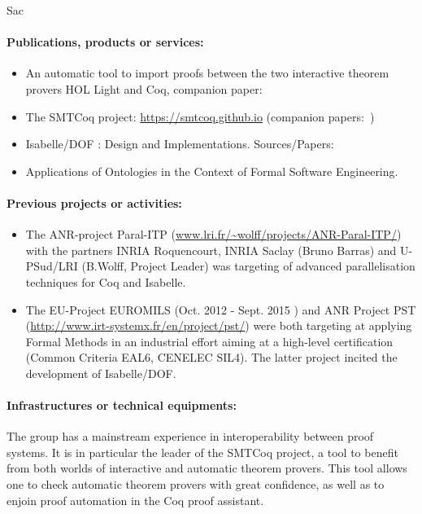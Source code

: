 \begin{sitedescription}{Sac}
\paragraph{Publications, products or services:}

\begin{itemize}
\item An automatic tool to import proofs between the two interactive
  theorem provers HOL Light and Coq, companion
  paper:~\cite{DBLP:conf/itp/KellerW10}
\item The SMTCoq project: \url{https://smtcoq.github.io} (companion
  papers:~\cite{DBLP:conf/cpp/ArmandFGKTW11,DBLP:conf/cav/EkiciMTKKRB17})
\item Isabelle/DOF : Design and Implementations.
 Sources/Papers: \cite{brucker_achim_d_2019_3370483,brucker.ea:isabelle-ontologies:2018}
\item Applications of Ontologies in the Context of Formal Software Engineering.
 \cite{brucker.ea:ontologies-certification:2019}
\end{itemize}


\paragraph{Previous projects or activities:}

\begin{itemize}
\item The ANR-project Paral-ITP (\url{www.lri.fr/~wolff/projects/ANR-Paral-ITP/}) with the  
      partners INRIA Roquencourt, INRIA Saclay (Bruno Barras) 
      and U-PSud/LRI (B.Wolff, Project Leader) was targeting 
      of advanced parallelisation techniques for Coq and Isabelle.
\item The EU-Project EUROMILS (Oct. 2012 - Sept. 2015 ) and 
      ANR Project PST (\url{http://www.irt-systemx.fr/en/project/pst/})
      were both targeting at applying Formal Methods in an industrial
      effort aiming at a high-level certification (Common Criteria EAL6, 
      CENELEC SIL4). The latter project incited the development of 
      Isabelle/DOF\cite{brucker_achim_d_2019_3370483}.
\end{itemize} 


\paragraph{Infrastructures or technical equipments:}

The group has a mainstream experience in interoperability between proof
systems. It is in particular the leader of the SMTCoq project, a tool to
benefit from both worlds of interactive and automatic theorem provers.
This tool allows one to check automatic theorem provers with great
confidence, as well as to enjoin proof automation in the Coq proof
assistant.


\end{sitedescription}
